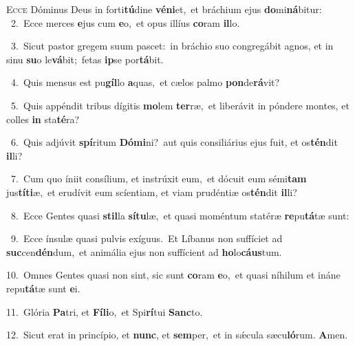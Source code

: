 \lettrine{\initial\textcolor{\initialcolor}{E}}{cce} Dóminus Deus in forti\-\textbf{tú}\-dine \textbf{vé}\-\textbf{ni}et,~\star et bráchium ejus \textbf{do}\-mi\-\textbf{ná}\-bitur:\\
{\numbfont\textcolor{\numbcolor}{~2.}}~Ecce merces \textbf{e}\-jus cum \textbf{e}\-o,~\star et opus illíus \textbf{co}\-ram \textbf{il}\-lo.\par
{\numbfont\textcolor{\numbcolor}{~3.}}~Sicut pastor gregem suum pascet:~\dagger in bráchio suo congregábit agnos, et in sinu \textbf{su}\-o le\-\textbf{vá}\-bit;~\star fetas \textbf{ip}\-se por\-\textbf{tá}\-bit.\par
{\numbfont\textcolor{\numbcolor}{~4.}}~Quis mensus est pu\-\textbf{gíl}\-lo \textbf{a}\-quas,~\star et cælos palmo \textbf{pon}\-de\-\textbf{rá}\-vit?\par
{\numbfont\textcolor{\numbcolor}{~5.}}~Quis appéndit tribus dígitis \textbf{mo}\-lem \textbf{ter}\-ræ,~\star et liberávit in póndere montes, et colles \textbf{in} sta\-\textbf{té}\-ra?\par
{\numbfont\textcolor{\numbcolor}{~6.}}~Quis adjúvit \textbf{spí}\-ritum \textbf{Dó}\-\textbf{mi}ni?~\star aut quis consiliárius ejus fuit, et os\-\textbf{tén}\-dit \textbf{il}\-li?\par
{\numbfont\textcolor{\numbcolor}{~7.}}~Cum quo íniit consílium, et instrúxit eum,~\dagger et dócuit eum sémi\textbf{tam} jus\-\textbf{tí}\-\textbf{ti}æ,~\star et erudívit eum scíentiam, et viam prudéntiæ os\-\textbf{tén}\-dit \textbf{il}\-li?\par
{\numbfont\textcolor{\numbcolor}{~8.}}~Ecce Gentes quasi \textbf{stil}\-la \textbf{sí}\-\textbf{tu}læ,~\star et quasi moméntum statéræ \textbf{re}\-pu\-\textbf{tá}\-tæ sunt:\par
{\numbfont\textcolor{\numbcolor}{~9.}}~Ecce ínsulæ quasi pulvis exíguus.~\dagger Et Líbanus non suffíciet ad \textbf{suc}\-cen\-\textbf{dén}\-dum,~\star et animália ejus non suffícient ad \textbf{ho}\-lo\-\textbf{cáus}\-tum.\par
{\numbfont\textcolor{\numbcolor}{10.}}~Omnes Gentes quasi non sint, sic sunt \textbf{co}\-ram \textbf{e}\-o,~\star et quasi níhilum et ináne repu\-\textbf{tá}\-tæ sunt \textbf{e}\-i.\par
{\numbfont\textcolor{\numbcolor}{11.}}~Glória \textbf{Pa}\-tri, et \textbf{Fí}\-\textbf{li}o,~\star et Spi\-\textbf{rí}\-tui \textbf{Sanc}\-to.\par
{\numbfont\textcolor{\numbcolor}{12.}}~Sicut erat in princípio, et \textbf{nunc}\-, et \textbf{sem}\-per,~\star et in sǽcula sæcu\-\textbf{ló}\-rum. \textbf{A}\-men.\par
